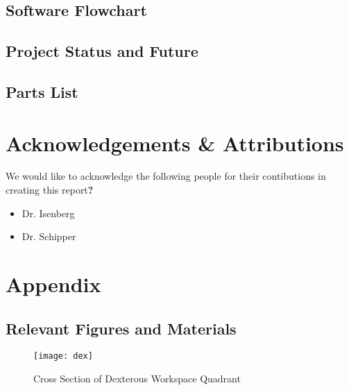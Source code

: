 \newpage
\subsection{Software Flowchart}


% 

\subsection{Project Status and Future}
\newpage
\subsection{Parts List}






% 
% 

\newpage
\section*{Acknowledgements \& Attributions}
We would like to acknowledge the following people for their contibutions in creating this report\textbf{?}
\begin{itemize}
  \item Dr. Isenberg
  \item Dr. Schipper
\end{itemize}
\newpage



\newpage
\appendix
\renewcommand\thesection{\Roman{section}}
\renewcommand\thesubsection{\roman{subsection}}
\section{Appendix}\label{sec:app}
\subsection{Relevant Figures and Materials}
\begin{figure}[htp]
  \centering
  \texttt{[image: dex]}
  \caption{Cross Section of Dexterous Workspace Quadrant}
  \label{fig:dex}
\end{figure}
